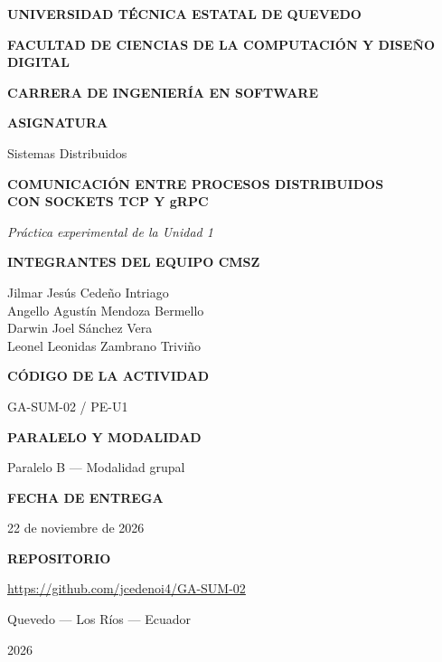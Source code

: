 \begin{titlepage}
\centering
\thispagestyle{empty}

{\large\bfseries UNIVERSIDAD TÉCNICA ESTATAL DE QUEVEDO\par}
\vspace{0.3cm}
{\bfseries FACULTAD DE CIENCIAS DE LA COMPUTACIÓN Y DISEÑO DIGITAL\par}
\vspace{0.2cm}
{\bfseries CARRERA DE INGENIERÍA EN SOFTWARE\par}

\vspace{1.6cm}

{\bfseries ASIGNATURA\par}
{Sistemas Distribuidos\par}

\vspace{1.4cm}

{\Large\bfseries COMUNICACIÓN ENTRE PROCESOS DISTRIBUIDOS\\[0.2cm]
CON SOCKETS TCP Y gRPC\par}

\vspace{0.6cm}
{\itshape Práctica experimental de la Unidad 1\par}

\vspace{1.4cm}

{\bfseries INTEGRANTES DEL EQUIPO CMSZ\par}
\vspace{0.2cm}
Jilmar Jesús Cedeño Intriago\\
Angello Agustín Mendoza Bermello\\
Darwin Joel Sánchez Vera\\
Leonel Leonidas Zambrano Triviño

\vspace{1.0cm}

{\bfseries CÓDIGO DE LA ACTIVIDAD\par}
{GA-SUM-02 / PE-U1\par}

\vspace{0.6cm}

{\bfseries PARALELO Y MODALIDAD\par}
{Paralelo B --- Modalidad grupal\par}

\vspace{0.6cm}

{\bfseries FECHA DE ENTREGA\par}
{22 de noviembre de 2026\par}

\vspace{0.6cm}

{\bfseries REPOSITORIO\par}
{\small\url{https://github.com/jcedenoi4/GA-SUM-02}}

\vfill

{Quevedo --- Los Ríos --- Ecuador\par}
{2026\par}

\end{titlepage}
